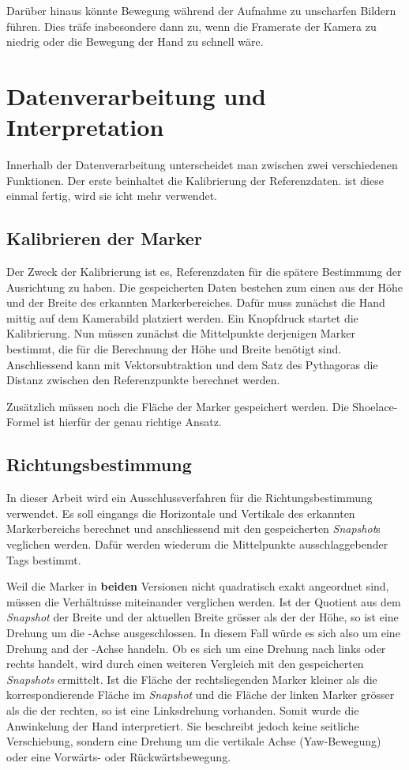 Darüber hinaus könnte Bewegung während der Aufnahme zu unscharfen Bildern führen.
Dies träfe insbesondere dann zu, wenn die Framerate der Kamera zu niedrig oder die Bewegung der Hand zu schnell wäre.

\section{Datenverarbeitung und Interpretation}
Innerhalb der Datenverarbeitung unterscheidet man zwischen zwei verschiedenen Funktionen.
Der erste beinhaltet die Kalibrierung der Referenzdaten.
ist diese einmal fertig, wird sie icht mehr verwendet.

\subsection{Kalibrieren der Marker}
Der Zweck der Kalibrierung ist es, Referenzdaten für die spätere Bestimmung der Ausrichtung zu haben.\footnotemark{}
Die gespeicherten Daten bestehen zum einen aus der Höhe und der Breite des erkannten Markerbereiches.
Dafür muss zunächst die Hand mittig auf dem Kamerabild platziert werden.
Ein Knopfdruck startet die Kalibrierung. 
Nun müssen zunächst die Mittelpunkte derjenigen Marker bestimmt, die für die Berechnung der Höhe und Breite benötigt sind.
Anschliessend kann mit Vektorsubtraktion und dem Satz des Pythagoras die Distanz zwischen den Referenzpunkte berechnet werden.

Zusätzlich müssen noch die Fläche der Marker gespeichert werden.
Die Shoelace-Formel ist hierfür der genau richtige Ansatz.

\subsection{Richtungsbestimmung}
In dieser Arbeit wird ein Ausschlussverfahren für die Richtungsbestimmung verwendet.
Es soll eingangs die Horizontale und Vertikale des erkannten Markerbereichs berechnet und anschliessend mit den gespeicherten \textit{Snapshot}s veglichen werden.
Dafür werden wiederum die Mittelpunkte ausschlaggebender Tags bestimmt.

Weil die Marker in \textbf{beiden} Versionen nicht quadratisch exakt angeordnet sind, müssen die Verhältnisse miteinander verglichen werden.
Ist der Quotient aus dem \textit{Snapshot} der Breite und der aktuellen Breite grösser als der der Höhe, so ist eine Drehung um die -Achse ausgeschlossen.
In diesem Fall würde es sich also um eine Drehung and der -Achse handeln.
Ob es sich um eine Drehung nach links oder rechts handelt, wird durch einen weiteren Vergleich mit den gespeicherten \textit{Snapshots} ermittelt.
Ist die Fläche der rechtsliegenden Marker kleiner als die korrespondierende Fläche im \textit{Snapshot} und die Fläche der linken Marker grösser als die der rechten, so ist eine Linksdrehung vorhanden.
Somit wurde die Anwinkelung der Hand interpretiert.
Sie beschreibt jedoch keine seitliche Verschiebung, sondern eine Drehung um die vertikale Achse (Yaw-Bewegung) oder eine Vorwärts- oder Rückwärtsbewegung.

